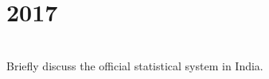 \section*{2017}
\vspace{-.5cm}
\hrulefill \smallskip\\
 Briefly discuss the official statistical system in India.
